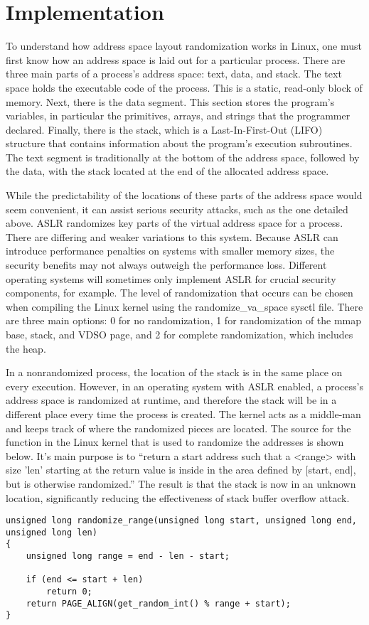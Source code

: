 \section{Implementation}
\label{s:implementation} %

To understand how address space layout randomization works in Linux, one must first know how an address space is laid out for a particular process. There are three main parts of a process’s address space: text, data, and stack. The text space holds the executable code of the process. This is a static, read-only block of memory. Next, there is the data segment. This section stores the program’s variables, in particular the primitives, arrays, and strings that the programmer declared. Finally, there is the stack, which is a Last-In-First-Out (LIFO) structure that contains information about the program’s execution subroutines. The text segment is traditionally at the bottom of the address space, followed by the data, with the stack located at the end of the allocated address space.

While the predictability of the locations of these parts of the address space would seem convenient, it can assist serious security attacks, such as the one detailed above. ASLR randomizes key parts of the virtual address space for a process. There are differing and weaker variations to this system. Because ASLR can introduce performance penalties on systems with smaller memory sizes, the security benefits may not always outweigh the performance loss. Different operating systems will sometimes only implement ASLR for crucial security components, for example. The level of randomization that occurs can be chosen when compiling the Linux kernel using the randomize\_va\_space sysctl file. There are three main options: 0 for no randomization, 1 for randomization of the mmap base, stack, and VDSO page, and 2 for complete randomization, which includes the heap. \cite{kerneldocs}

In a nonrandomized process, the location of the stack is in the same place on every execution. However, in an operating system with ASLR enabled, a process’s address space is randomized at runtime, and therefore the stack will be in a different place every time the process is created. The kernel acts as a middle-man and keeps track of where the randomized pieces are located. The source for the function in the Linux kernel that is used to randomize the addresses is shown below. It’s main purpose is to “return a start address such that a <range> with size 'len' starting at the return value is inside in the area defined by [start, end], but is otherwise randomized.” \cite{randomc} The result is that the stack is now in an unknown location, significantly reducing the effectiveness of stack buffer overflow attack.

\begin{lstlisting}[caption=Source for the range randomization function]
unsigned long randomize_range(unsigned long start, unsigned long end, unsigned long len)
{
	unsigned long range = end - len - start;

	if (end <= start + len)
		return 0;
	return PAGE_ALIGN(get_random_int() % range + start);
}
\end{lstlisting}
